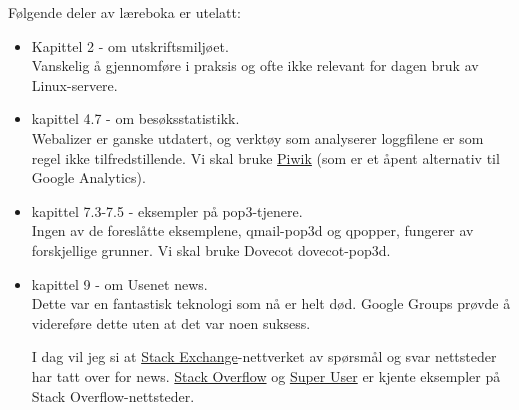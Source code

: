 Følgende deler av læreboka er utelatt:

\begin{itemize}
\item Kapittel 2 - om utskriftsmiljøet.\\
    Vanskelig å gjennomføre i praksis og ofte ikke relevant for dagen bruk av Linux-servere.
\item kapittel 4.7 - om besøksstatistikk.\\
    Webalizer er ganske utdatert, og verktøy som analyserer loggfilene er som regel ikke tilfredstillende.
    Vi skal bruke \href{https://piwik.org/}{Piwik} (som er et åpent alternativ til Google Analytics).
\item kapittel 7.3-7.5 - eksempler på pop3-tjenere.\\
    Ingen av de foreslåtte eksemplene, qmail-pop3d og qpopper, fungerer av forskjellige grunner.
    Vi skal bruke Dovecot dovecot-pop3d.
\item kapittel 9 - om Usenet news.\\
    Dette var en fantastisk teknologi som nå er helt død. 
    Google Groups prøvde å videreføre dette uten at det var noen suksess.

    I dag vil jeg si at \href{https://stackexchange.com/}{Stack Exchange}-nettverket av
    spørsmål og svar nettsteder har tatt over for news. \href{https://stackoverflow.com/}{Stack Overflow} og
    \href{https://superuser.com/}{Super User} er kjente eksempler på Stack Overflow-nettsteder.
\end{itemize}


